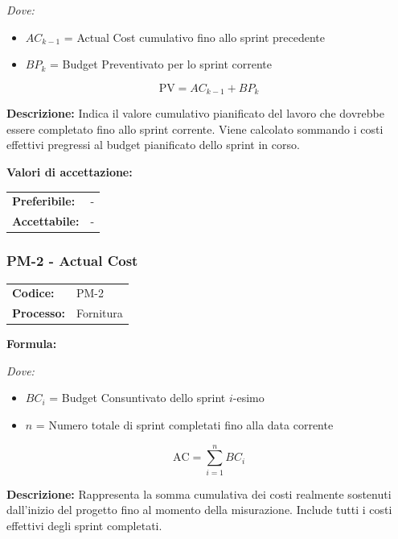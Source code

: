 \documentclass[a4paper,11pt,oneside]{scrartcl}
\begin{document}
\noindent\textit{Dove:}
\begin{itemize}[leftmargin=1.5cm, topsep=0pt, itemsep=0pt]
    \item $AC_{k-1}$ = Actual Cost cumulativo fino allo sprint{\scriptsize{}} precedente
    \item $BP_k$ = Budget Preventivato per lo sprint corrente
\end{itemize}

\[
    \text{PV} = AC_{k-1} + BP_k
\]

\noindent\textbf{Descrizione:} Indica il valore cumulativo pianificato del lavoro che dovrebbe essere completato fino allo sprint corrente. Viene calcolato sommando i costi effettivi pregressi al budget pianificato dello sprint in corso.

\vspace{0.2cm}
\noindent\textbf{Valori di accettazione:}
\vspace{0.1cm}

\noindent
\begin{tabular}{@{}ll@{}}
    \textbf{Preferibile:} & - \\
    \textbf{Accettabile:} & - \\
\end{tabular}

\subsubsection{PM-2 - Actual Cost}

\noindent
\begin{tabular}{@{}p{}p{}@{}}
    \textbf{Codice:}   & PM-2      \\
    \textbf{Processo:} & Fornitura \\
\end{tabular}

\vspace{0.3cm}
\noindent\textbf{Formula:}

\noindent\textit{Dove:}
\begin{itemize}[leftmargin=1.5cm, topsep=0pt, itemsep=0pt]
    \item $BC_i$ = Budget Consuntivato dello sprint $i$-esimo
    \item $n$ = Numero totale di sprint completati fino alla data corrente
\end{itemize}

\[
    \text{AC} = \sum_{i=1}^{n} BC_i
\]

\noindent\textbf{Descrizione:} Rappresenta la somma cumulativa dei costi realmente sostenuti dall'inizio del progetto fino al momento della misurazione. Include tutti i costi effettivi degli sprint completati.
\end{document}
